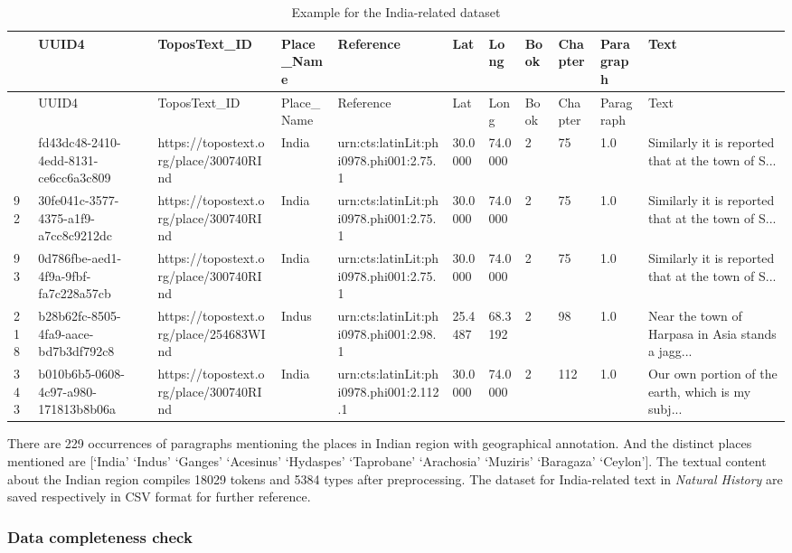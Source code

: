 \documentclass[
  12pt,
]{article}
\begin{document}
\hypertarget{tbl-dataset_indiatext}{}
\begin{longtable}[]{@{}lllllllllll@{}}
\caption{\label{tbl-dataset_indiatext}Example for the India-related
dataset}\tabularnewline
\toprule\noalign{}
& UUID4 & ToposText\_ID & Place\_Name & Reference & Lat & Long & Book &
Chapter & Paragraph & Text \\
\midrule\noalign{}
\endfirsthead
\toprule\noalign{}
& UUID4 & ToposText\_ID & Place\_Name & Reference & Lat & Long & Book &
Chapter & Paragraph & Text \\
\midrule\noalign{}
\endhead
\bottomrule\noalign{}
\endlastfoot
85 & fd43dc48-2410-4edd-8131-ce6cc6a3c809 &
https://topostext.org/place/300740RInd & India &
urn:cts:latinLit:phi0978.phi001:2.75.1 & 30.0000 & 74.0000 & 2 & 75 &
1.0 & Similarly it is reported that at the town of S... \\
92 & 30fe041c-3577-4375-a1f9-a7cc8c9212dc &
https://topostext.org/place/300740RInd & India &
urn:cts:latinLit:phi0978.phi001:2.75.1 & 30.0000 & 74.0000 & 2 & 75 &
1.0 & Similarly it is reported that at the town of S... \\
93 & 0d786fbe-aed1-4f9a-9fbf-fa7c228a57cb &
https://topostext.org/place/300740RInd & India &
urn:cts:latinLit:phi0978.phi001:2.75.1 & 30.0000 & 74.0000 & 2 & 75 &
1.0 & Similarly it is reported that at the town of S... \\
218 & b28b62fc-8505-4fa9-aace-bd7b3df792c8 &
https://topostext.org/place/254683WInd & Indus &
urn:cts:latinLit:phi0978.phi001:2.98.1 & 25.4487 & 68.3192 & 2 & 98 &
1.0 & Near the town of Harpasa in Asia stands a jagg... \\
343 & b010b6b5-0608-4c97-a980-171813b8b06a &
https://topostext.org/place/300740RInd & India &
urn:cts:latinLit:phi0978.phi001:2.112.1 & 30.0000 & 74.0000 & 2 & 112 &
1.0 & Our own portion of the earth, which is my subj... \\
\end{longtable}

There are 229 occurrences of paragraphs mentioning the places in Indian
region with geographical annotation. And the distinct places mentioned
are {[}`India' `Indus' `Ganges' `Acesinus' `Hydaspes' `Taprobane'
`Arachosia' `Muziris' `Baragaza' `Ceylon'{]}. The textual content about
the Indian region compiles 18029 tokens and 5384 types after
preprocessing. The dataset for India-related text in \emph{Natural
History} are saved respectively in CSV format for further reference.

\hypertarget{data-completeness-check}{%
\subsubsection{Data completeness check}\label{data-completeness-check}}
\end{document}
